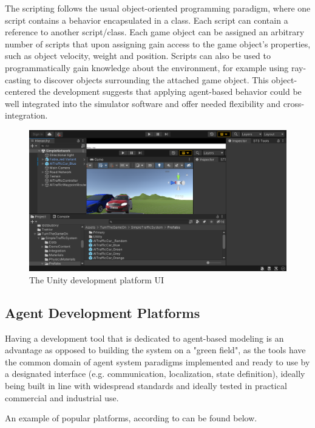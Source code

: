 \documentclass[main.tex]{subfiles}
\begin{document}
The scripting follows the usual object-oriented programming paradigm, where one script contains a
behavior encapsulated in a class. Each script can contain a reference to another
script/class. Each game object can be assigned an arbitrary number of scripts that upon 
assigning gain access to the game object's properties, such as object velocity, weight and position. 
Scripts can also be used to programmatically gain knowledge about the environment, for example 
using ray-casting to discover objects surrounding the attached game object. This object-centered 
the development suggests that applying agent-based behavior could be well integrated into the 
simulator software and offer needed flexibility and cross-integration.

\begin{figure}[htbp]
    \centering
    \includegraphics[width=.9\textwidth]{unityUI.png}
    \caption{The Unity development platform UI}
    \label{fig-unity}
\end{figure}

\subsection{Agent Development Platforms}

Having a development tool that is dedicated to agent-based modeling is an advantage as opposed to building the 
system on a "green field", as the tools have the common domain of agent system paradigms implemented and ready 
to use by a designated interface (e.g. communication, localization, state definition), ideally being built in line 
with widespread standards and ideally tested in practical commercial and industrial use. 

An example of popular platforms, according to \cite{Binder2022} can be found below. 
\end{document}
